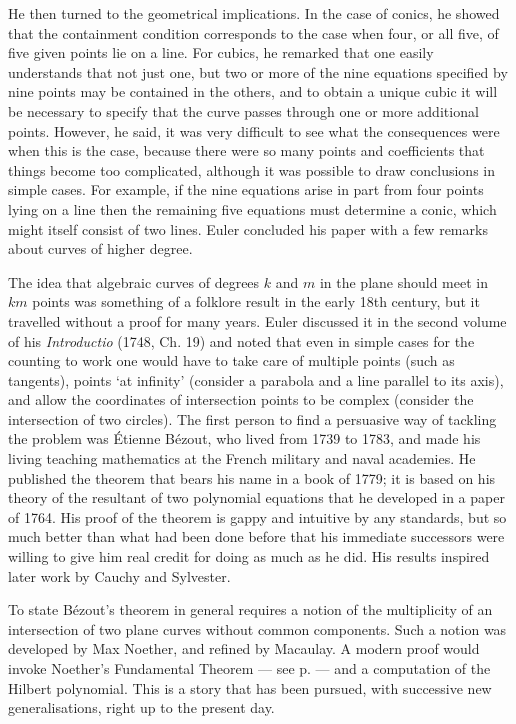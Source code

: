 He then turned to the geometrical implications. In the case of conics, he showed that the containment condition corresponds to the case when four, or all five, of five given points lie on a line.  For cubics, he remarked that one easily understands that not just one, but two or more of the nine equations specified by nine points may be contained in the others, and to obtain a unique cubic it will be necessary to specify that the curve passes through one or more additional points.  However, he said, it was very difficult to see what the consequences were when this is the case, because there were so many points and coefficients that things become too complicated, although it was possible to draw conclusions in simple cases. For example, if the nine equations arise in part from four points lying on a line then the remaining five equations must determine a conic, which might itself consist of two lines. Euler concluded his paper with a few remarks about curves of higher degree.


The idea that algebraic curves of degrees $k$ and $m$ in the plane should meet in $km$ points was something of a folklore result in the early 18th century, but it travelled without a proof for many years. Euler discussed it in the second volume of his  \emph{Introductio} (1748, Ch. 19) and noted that even in simple cases  for the counting to work one would have to take care of multiple points (such as tangents),  points `at infinity' (consider a parabola and a line parallel to its axis), and allow the  coordinates of intersection points to be complex (consider the intersection of two circles). The first person to find a persuasive way of tackling the problem was \'Etienne B\'ezout, who lived from 1739 to 1783, and made his living teaching mathematics at the French military and naval academies. He published the theorem that bears his name in a book of 1779; it is based on his theory of the resultant of two polynomial equations that he developed in a paper of 1764. His proof of the theorem is gappy and intuitive by any standards, but so much better than what had been done before that his immediate successors were willing to give him real credit for doing as much as he did. His results inspired later work by Cauchy and Sylvester.

To state  B\'ezout's theorem in general requires a notion of the multiplicity of an intersection of two plane curves without common components. Such a notion was developed by Max Noether, and refined by Macaulay. A modern proof would invoke Noether's Fundamental Theorem --- see p. \pageref{Noether'sFT} --- and a computation of the Hilbert polynomial. This is a story that  has been pursued, with successive new generalisations, right up to the present day. 



